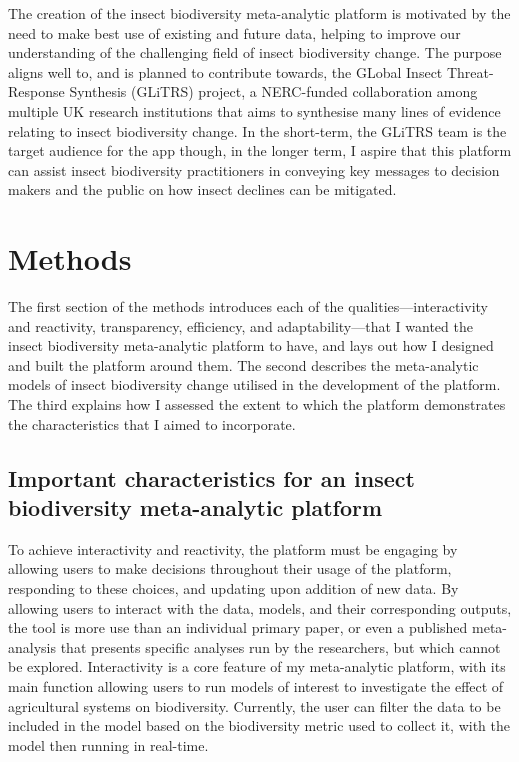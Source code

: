 \documentclass[11pt]{article}
\begin{document}
		\noindent The creation of the insect biodiversity meta-analytic platform is motivated by the need to make best use of existing and future data, helping to improve our understanding of the challenging field of insect biodiversity change. The purpose aligns well to, and is planned to contribute towards, the GLobal Insect Threat-Response Synthesis (GLiTRS) project, a NERC-funded collaboration among multiple UK research institutions that aims to synthesise many lines of evidence relating to insect biodiversity change. In the short-term, the GLiTRS team is the target audience for the app though, in the longer term, I aspire that this platform can assist insect biodiversity practitioners in conveying key messages to decision makers and the public on how insect declines can be mitigated.
		
		\clearpage 
		
		\section{Methods}
		The first section of the methods introduces each of the qualities—interactivity and reactivity, transparency, efficiency, and adaptability—that I wanted the insect biodiversity meta-analytic platform to have, and lays out how I designed and built the platform around them. The second describes the meta-analytic models of insect biodiversity change utilised in the development of the platform. The third explains how I assessed the extent to which the platform demonstrates the characteristics that I aimed to incorporate. 
		
		\subsection{Important characteristics for an insect biodiversity meta-analytic platform}
		To achieve interactivity and reactivity, the platform must be engaging by allowing users to make decisions throughout their usage of the platform, responding to these choices, and updating upon addition of new data. By allowing users to interact with the data, models, and their corresponding outputs, the tool is more use than an individual primary paper, or even a published meta-analysis that presents specific analyses run by the researchers, but which cannot be explored. Interactivity is a core feature of my meta-analytic platform, with its main function allowing users to run models of interest to investigate the effect of agricultural systems on biodiversity. Currently, the user can filter the data to be included in the model based on the biodiversity metric used to collect it, with the model then running in real-time. 
		
\end{document}

